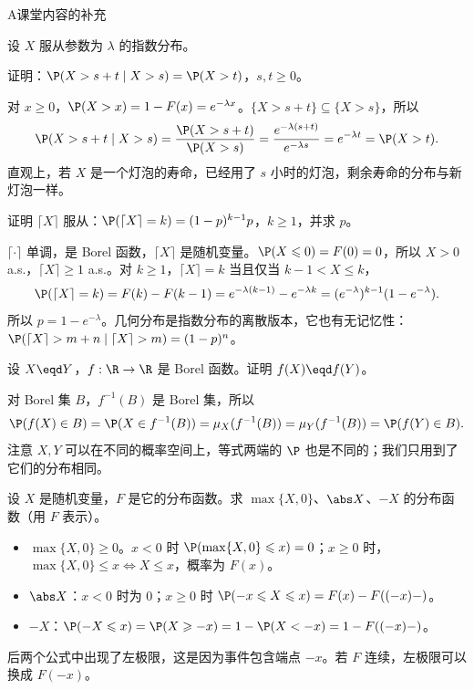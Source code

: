 \begin{exercises}{A}{课堂内容的补充}
\item\label{ex:distributions:A6} 设 $X$ 服从参数为 $\lambda$ 的指数分布。
\begin{questions}
\item 证明：$\P(X>s+t\mid X>s)=\P(X>t)$，$s,t\geqslant0$。
\begin{solution}
对 $x\geqslant0$，$\P(X>x)=1-F(x)=e^{-\lambda x}$。$\{X>s+t\}\subseteq\{X>s\}$，所以
\[
\P(X>s+t\mid X>s)=\frac{\P(X>s+t)}{\P(X>s)}=\frac{e^{-\lambda(s+t)}}{e^{-\lambda s}}=e^{-\lambda t}=\P(X>t).
\]
直观上，若 $X$ 是一个灯泡的寿命，已经用了 $s$ 小时的灯泡，剩余寿命的分布与新灯泡一样。
\end{solution}
\item 证明 $\lceil X\rceil$ 服从：$\P(\lceil X\rceil=k)=(1-p)^{k-1}p$，$k\geqslant1$，并求 $p$。
\begin{solution}
$\lceil\cdot\rceil$ 单调，是 Borel 函数，$\lceil X\rceil$ 是随机变量。$\P(X\leqslant0)=F(0)=0$，所以 $X>0$ a.s.，$\lceil X\rceil\geqslant1$ a.s.。对 $k\geqslant1$，$\lceil X\rceil=k$ 当且仅当 $k-1<X\leqslant k$，
\[
\P(\lceil X\rceil=k)=F(k)-F(k-1)=e^{-\lambda(k-1)}-e^{-\lambda k}=(e^{-\lambda})^{k-1}(1-e^{-\lambda}).
\]
所以 $p=1-e^{-\lambda}$。几何分布是指数分布的离散版本，它也有无记忆性：$\P(\lceil X\rceil>m+n\mid\lceil X\rceil>m)=(1-p)^n$。
\end{solution}
\end{questions}

\item\label{ex:distributions:A7} 设 $X\eqd Y$，$f:\R\to\R$ 是 Borel 函数。证明 $f(X)\eqd f(Y)$。
\begin{solution}
对 Borel 集 $B$，$f^{-1}(B)$ 是 Borel 集，所以
\[
\P(f(X)\in B)=\P(X\in f^{-1}(B))=\mu_X(f^{-1}(B))=\mu_Y(f^{-1}(B))=\P(f(Y)\in B).
\]
注意 $X,Y$ 可以在不同的概率空间上，等式两端的 $\P$ 也是不同的；我们只用到了它们的分布相同。
\end{solution}

\item\label{ex:distributions:A8} 设 $X$ 是随机变量，$F$ 是它的分布函数。求 $\max\{X,0\}$、$\abs X$、$-X$ 的分布函数（用 $F$ 表示）。
\begin{solution}
\begin{itemize}
\item $\max\{X,0\}\geqslant0$。$x<0$ 时 $\P(\max\{X,0\}\leqslant x)=0$；$x\geqslant0$ 时，$\max\{X,0\}\leqslant x\iff X\leqslant x$，概率为 $F(x)$。
\item $\abs X$：$x<0$ 时为 $0$；$x\geqslant0$ 时 $\P(-x\leqslant X\leqslant x)=F(x)-F((-x)-)$。
\item $-X$：$\P(-X\leqslant x)=\P(X\geqslant-x)=1-\P(X<-x)=1-F((-x)-)$。
\end{itemize}
后两个公式中出现了左极限，这是因为事件包含端点 $-x$。若 $F$ 连续，左极限可以换成 $F(-x)$。
\end{solution}


\end{exercises}

